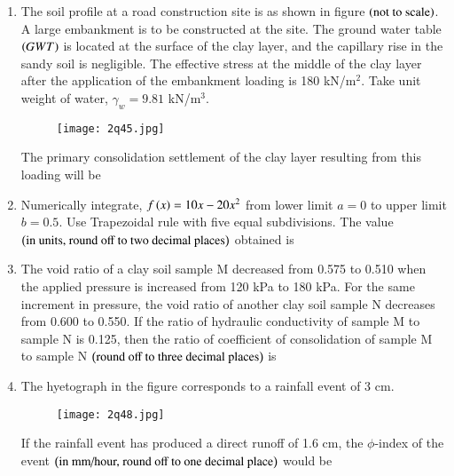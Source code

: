 \documentclass[journal,12pt,onecolumn]{article}
\theoremstyle{remark}
\begin{document}
\begin{enumerate}
\hfill{}

\item The soil profile at a road construction site is as shown in figure  $\left(\text{not to scale}\right)$. A large embankment is to be constructed at the site. The ground water table $\left(GWT\right)$ is located at the surface of the clay layer, and the capillary rise in the sandy soil is negligible. The effective stress at the middle of the clay layer after the application of the embankment loading is 180 kN/m$^2$. Take unit weight of water, $\gamma_w = 9.81$ kN/m$^3$.
\begin{figure}[H]
    \centering
    \texttt{[image: 2q45.jpg]}
    \caption{}
    \label{fig:q45}
\end{figure}
The primary consolidation settlement  of the clay layer resulting from this loading will be \underline{\hspace{2cm}}

\hfill{}

\item Numerically integrate, $f\left(x\right) = 10x - 20x^2$ from lower limit $a = 0$ to upper limit $b = 0.5$. Use Trapezoidal rule with five equal subdivisions. The value $\left(\text{in units, round off to two decimal places}\right)$ obtained is \underline{\hspace{2cm}}

\hfill{}

\item The void ratio of a clay soil sample M decreased from 0.575 to 0.510 when the applied pressure is increased from 120 kPa to 180 kPa. For the same increment in pressure, the void ratio of another clay soil sample N decreases from 0.600 to 0.550. If the ratio of hydraulic conductivity of sample M to sample N is 0.125, then the ratio of coefficient of consolidation of sample M to sample N $\left(\text{round off to three decimal places}\right)$ is \underline{\hspace{2cm}}

\hfill{}

\item The hyetograph in the figure  corresponds to a rainfall event of 3 cm.
\begin{figure}[H]
    \centering
    \texttt{[image: 2q48.jpg]}
    \caption{}
    \label{fig:q48}
\end{figure}
If the rainfall event has produced a direct runoff of 1.6 cm, the $\phi$-index of the event $\left(\text{in mm/hour, round off to one decimal place}\right)$ would be \underline{\hspace{2cm}}


\end{enumerate}
\end{document}
